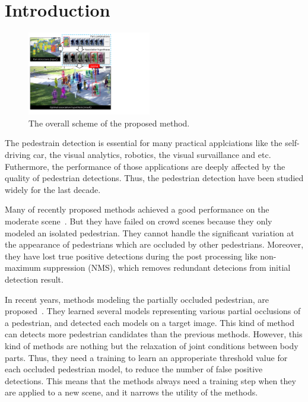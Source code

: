 \documentclass[10pt,twocolumn,letterpaper]{article}
\begin{document}
\section{Introduction}
\label{sec:introduction}
\begin{figure}[t]
   \includegraphics[width=0.48\textwidth]{../figures/teasure.pdf}
   \caption{The overall scheme of the proposed method.}
   \label{fig:overall_scheme}
\end{figure}

The pedestrain detection is essential for many practical applciations like the self-driving car, the visual analytics, robotics, the visual survaillance and etc.
Futhermore, the performance of those applications are deeply affected by the quality of pedestrian detections.
Thus, the pedestrian detection have been studied widely for the last decade.

Many of recently proposed methods achieved a good performance on the moderate scene~\cite{dalal2005histograms, felzenszwalb2010object, dollar2009integral, DollarECCV2012crosstalkCascades}.
But they have failed on crowd scenes because they only modeled an isolated pedestrian.
They cannot handle the significant variation at the appearance of pedestrians which are occluded by other pedestrians.
Moreover, they have lost true positive detections during the post processing like non-maximum suppression (NMS), which removes redundant detecions from initial detection result.

In recent years, methods modeling the partially occluded pedestrian, are proposed~\cite{ouyang2013modeling, ouyang2013joint}.
They learned several models representing various partial occlusions of a pedestrian, and detected each models on a target image.
This kind of method can detects more pedestrian candidates than the previous methods.
However, this kind of methods are nothing but the relaxation of joint conditions between body parts.
Thus, they need a training to learn an approperiate threshold value for each occluded pedestrian model, to reduce the number of false positive detections.
This means that the methods always need a training step when they are applied to a new scene, and it narrows the utility of the methods.
\end{document}
